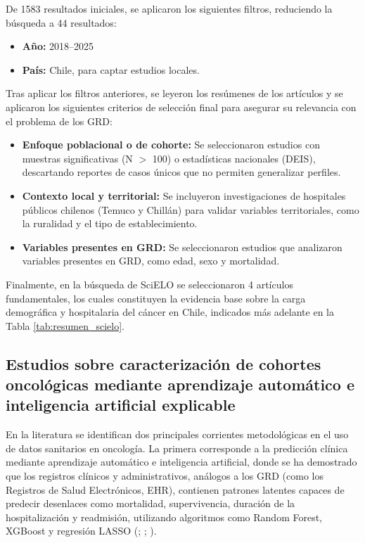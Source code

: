 De 1583 resultados iniciales, se aplicaron los siguientes filtros, reduciendo la búsqueda a 44 resultados:

\begin{itemize}
    \item \textbf{Año:} 2018--2025
    \item \textbf{País:} Chile, para captar estudios locales.
\end{itemize}

Tras aplicar los filtros anteriores, se leyeron los resúmenes de los artículos y se aplicaron los siguientes criterios de selección final para asegurar su relevancia con el problema de los GRD:

\begin{itemize}
    \item \textbf{Enfoque poblacional o de cohorte:} Se seleccionaron estudios con muestras significativas (N $>$ 100) o estadísticas nacionales (DEIS), descartando reportes de casos únicos que no permiten generalizar perfiles.
    \item \textbf{Contexto local y territorial:} Se incluyeron investigaciones de hospitales públicos chilenos (Temuco y Chillán) para validar variables territoriales, como la ruralidad y el tipo de establecimiento.
    \item \textbf{Variables presentes en GRD:} Se seleccionaron estudios que analizaron variables presentes en GRD, como edad, sexo y mortalidad.
\end{itemize}

Finalmente, en la búsqueda de SciELO se seleccionaron 4 artículos fundamentales, los cuales constituyen la evidencia base sobre la carga demográfica y hospitalaria del cáncer en Chile, indicados más adelante en la Tabla \ref{tab:resumen_scielo}.


\subsection{Estudios sobre caracterización de cohortes oncológicas mediante aprendizaje automático e inteligencia artificial explicable}

En la literatura se identifican dos principales corrientes metodológicas en el uso de datos sanitarios en oncología. La primera corresponde a la predicción clínica mediante aprendizaje automático e inteligencia artificial, donde se ha demostrado que los registros clínicos y administrativos, análogos a los GRD (como los Registros de Salud Electrónicos, EHR), contienen patrones latentes capaces de predecir desenlaces como mortalidad, supervivencia, duración de la hospitalización y readmisión, utilizando algoritmos como Random Forest, XGBoost y regresión LASSO (\cite{article2}; \cite{article3}; \cite{article10}).


